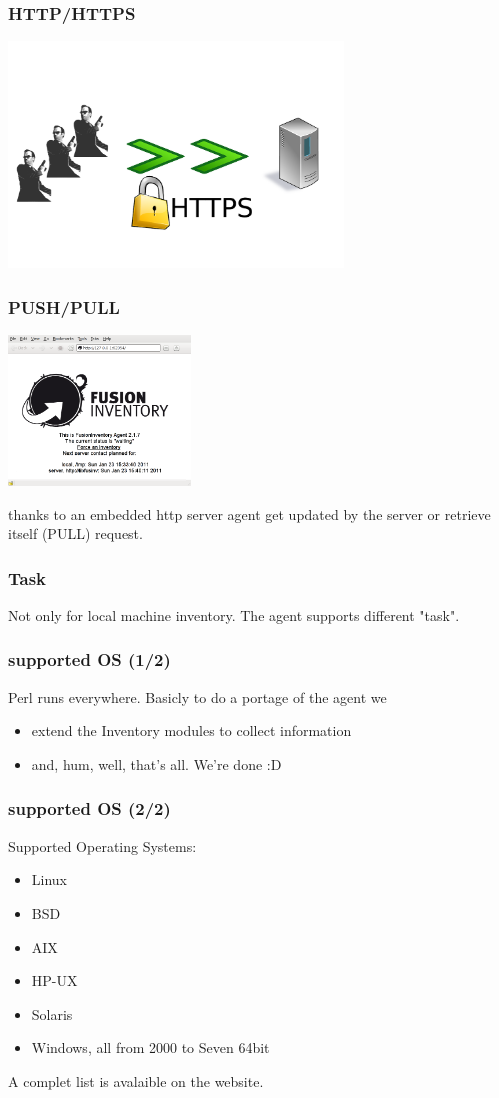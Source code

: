 \begin{frame}
\frametitle{HTTP/HTTPS}
%
\includegraphics[height=6.0cm]{pics/https.pdf}
%
\end{frame}
\begin{frame}
\frametitle{PUSH/PULL}
\includegraphics[height=4.0cm]{pics/http-server.png}

thanks to an embedded http server agent get updated by the server or retrieve itself (PULL) request.
%
\end{frame}



\begin{frame}
\frametitle{Task}
%
Not only for local machine inventory. The agent supports different "task".
\end{frame}



\begin{frame}
\frametitle{supported OS (1/2)}
Perl runs everywhere.
\pause
Basicly to do a portage of the agent we
\begin{itemize}
%
\item extend the Inventory modules to collect information
\item and, hum, well, that's all. We're done :D
%
\end{itemize}

\end{frame}
\begin{frame}
\frametitle{supported OS (2/2)}
Supported Operating Systems:
\begin{itemize}
%
\item Linux
\pause
\item BSD
\pause
\item AIX
\pause
\item HP-UX
\pause
\item Solaris
\pause
\item Windows, all from 2000 to Seven 64bit
%
\end{itemize}
A complet list is avalaible on the website.
\end{frame}
 
